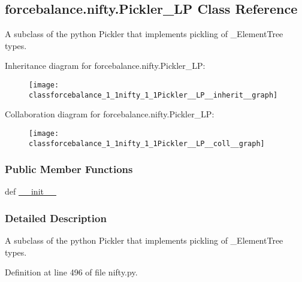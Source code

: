 \hypertarget{classforcebalance_1_1nifty_1_1Pickler__LP}{\subsection{forcebalance.\-nifty.\-Pickler\-\_\-\-L\-P Class Reference}
\label{classforcebalance_1_1nifty_1_1Pickler__LP}
}


A subclass of the python Pickler that implements pickling of \-\_\-\-Element\-Tree types.  




Inheritance diagram for forcebalance.\-nifty.\-Pickler\-\_\-\-L\-P\-:\nopagebreak
\begin{figure}[H]
\begin{center}
\leavevmode
\texttt{[image: classforcebalance\_1\_1nifty\_1\_1Pickler\_\_LP\_\_inherit\_\_graph]}
\end{center}
\end{figure}


Collaboration diagram for forcebalance.\-nifty.\-Pickler\-\_\-\-L\-P\-:\nopagebreak
\begin{figure}[H]
\begin{center}
\leavevmode
\texttt{[image: classforcebalance\_1\_1nifty\_1\_1Pickler\_\_LP\_\_coll\_\_graph]}
\end{center}
\end{figure}
\subsubsection*{Public Member Functions}
\begin{DoxyCompactItemize}
\item 
def \hyperlink{classforcebalance_1_1nifty_1_1Pickler__LP_af59a709f44c96a91c753ce02cff07ae8}{\-\_\-\-\_\-init\-\_\-\-\_\-}
\end{DoxyCompactItemize}


\subsubsection{Detailed Description}
A subclass of the python Pickler that implements pickling of \-\_\-\-Element\-Tree types. 



Definition at line 496 of file nifty.\-py.



